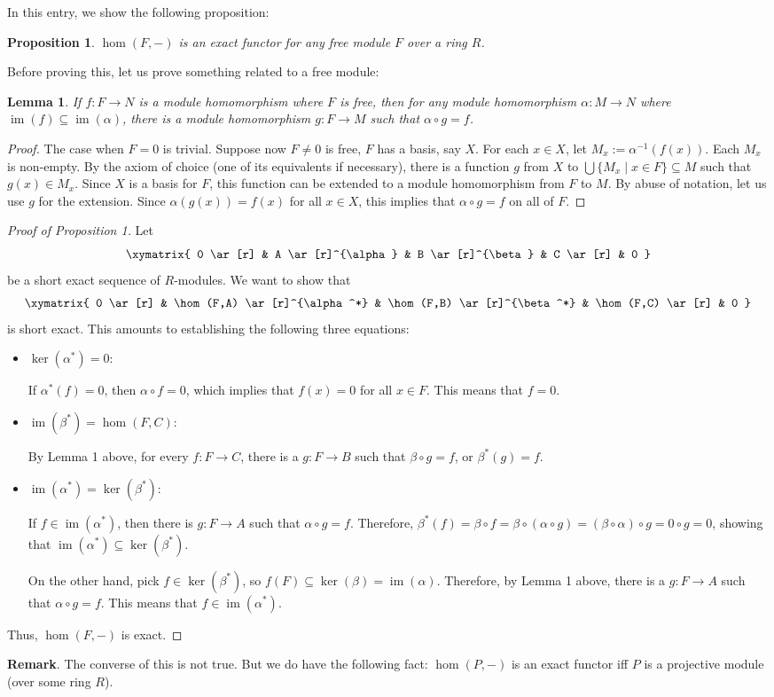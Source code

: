 \documentclass[12pt]{article}
\newtheorem{prop}{Proposition}
\newtheorem{lem}{Lemma}
\newcommand{\im}{\operatorname{im}}
\begin{document}
In this entry, we show the following proposition:

\begin{prop} $\hom(F,-)$ is an exact functor for any free module $F$ over a ring $R$. \end{prop}

Before proving this, let us prove something related to a free module:
\begin{lem} If $f:F\to N$ is a module homomorphism where $F$ is free, then for any module homomorphism $\alpha: M\to N$  where $\im(f)\subseteq \im(\alpha)$, there is a module homomorphism $g:F\to M$ such that $\alpha \circ g = f$.  \end{lem}

\begin{proof}
The case when $F=0$ is trivial.  Suppose now $F\ne 0$ is free, $F$ has a basis, say $X$.  For each $x\in X$, let $M_x:=\alpha^{-1}(f(x))$.  Each $M_x$ is non-empty.  By the axiom of choice (one of its equivalents if necessary), there is a function $g$ from $X$ to $\bigcup \lbrace M_x\mid x\in F\rbrace \subseteq M$ such that $g(x)\in M_x$.  Since $X$ is a basis for $F$, this function can be extended to a module homomorphism from $F$ to $M$.  By abuse of notation, let us use $g$ for the extension.  Since $\alpha (g(x))=f(x)$ for all $x\in X$, this implies that $\alpha\circ g=f$ on all of $F$.
\end{proof}

\begin{proof}[Proof of Proposition 1]
Let 
$$
\xymatrix{
0 \ar[r] & A \ar[r]^{\alpha} & B \ar[r]^{\beta} & C \ar[r] & 0
}
$$
be a short exact sequence of $R$-modules.  We want to show that 
$$
\xymatrix{
0 \ar[r] & \hom(F,A) \ar[r]^{\alpha^*} & \hom(F,B) \ar[r]^{\beta^*} & \hom(F,C) \ar[r] & 0
}
$$
is short exact.  This amounts to establishing the following three equations:
\begin{itemize}
\item
$\ker(\alpha^*)=0$:  

If $\alpha^*(f)=0$, then $\alpha\circ f=0$, which implies that $f(x)=0$ for all $x\in F$.  This means that $f=0$.

\item
$\im(\beta^*)=\hom(F,C)$: 

By Lemma 1 above, for every $f:F\to C$, there is a $g:F\to B$ such that $\beta \circ g = f$, or $\beta^*(g)=f$.

\item
$\im(\alpha^*)=\ker(\beta^*)$: 

If $f\in \im(\alpha^*)$, then there is $g: F\to A$ such that $\alpha \circ g = f$.  Therefore, $\beta^*(f)=\beta\circ f= \beta \circ (\alpha \circ g)=(\beta\circ \alpha)\circ g=0\circ g=0$, showing that $\im(\alpha^*)\subseteq \ker(\beta^*)$.  

On the other hand, pick $f\in \ker(\beta^*)$, so $f(F)\subseteq \ker(\beta)=\im(\alpha)$.  Therefore, by Lemma 1 above, there is a $g:F\to A$ such that $\alpha\circ g=f$.  This means that $f\in \im(\alpha^*)$.
\end{itemize}
Thus, $\hom(F,-)$ is exact.
\end{proof}

\textbf{Remark}.  The converse of this is not true.  But we do have the following fact: $\hom(P,-)$ is an exact functor iff $P$ is a projective module (over some ring $R$).
\end{document}
